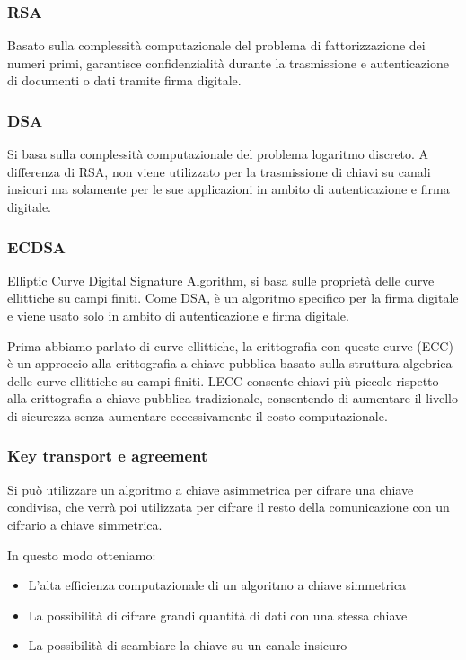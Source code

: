 \subsubsection{RSA}\label{rsa}

Basato sulla complessità computazionale del problema di fattorizzazione
dei numeri primi, garantisce confidenzialità durante la trasmissione e
autenticazione di documenti o dati tramite firma digitale.

\subsubsection{DSA}\label{dsa}

Si basa sulla complessità computazionale del problema logaritmo
discreto. A differenza di RSA, non viene utilizzato per la trasmissione
di chiavi su canali insicuri ma solamente per le sue applicazioni in
ambito di autenticazione e firma digitale.

\subsubsection{ECDSA}\label{ecdsa}

Elliptic Curve Digital Signature Algorithm, si basa sulle proprietà
delle curve ellittiche su campi finiti. Come DSA, è un algoritmo
specifico per la firma digitale e viene usato solo in ambito di
autenticazione e firma digitale.

Prima abbiamo parlato di curve ellittiche, la crittografia con queste
curve (ECC) è un approccio alla crittografia a chiave pubblica basato
sulla struttura algebrica delle curve ellittiche su campi finiti.
L\textquotesingle ECC consente chiavi più piccole rispetto alla
crittografia a chiave pubblica tradizionale, consentendo di aumentare il
livello di sicurezza senza aumentare eccessivamente il costo
computazionale.

\subsubsection{Key transport e
agreement}\label{key-transport-e-agreement}

Si può utilizzare un algoritmo a chiave asimmetrica per cifrare una
chiave condivisa, che verrà poi utilizzata per cifrare il resto della
comunicazione con un cifrario a chiave simmetrica.

In questo modo otteniamo:

\begin{itemize}
\item
  L'alta efficienza computazionale di un algoritmo a chiave simmetrica
\item
  La possibilità di cifrare grandi quantità di dati con una stessa
  chiave
\item
  La possibilità di scambiare la chiave su un canale insicuro
\end{itemize}

